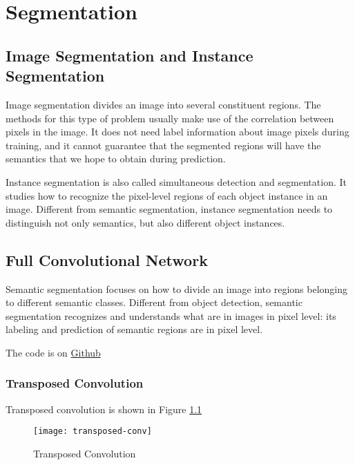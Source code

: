 
\chapter{Segmentation}

\section{Image Segmentation and Instance Segmentation}
\label{sec:image-segm-inst}

Image segmentation divides an image into several constituent regions.
The methods for this type of problem usually make use of the correlation between pixels in the image.
It does not need label information about image pixels during training, and it cannot guarantee that the segmented regions will have the semantics that we hope to obtain during prediction.

Instance segmentation is also called simultaneous detection and segmentation.
It studies how to recognize the pixel-level regions of each object instance in an image.
Different from semantic segmentation, instance segmentation needs to distinguish not only semantics, but also different object instances.


\section{Full Convolutional Network}
\label{sec:full-conv-netw}


Semantic segmentation focuses on how to divide an image into regions belonging to different semantic classes.
Different from object detection, semantic segmentation recognizes and understands what are in images in pixel level: its labeling and prediction of semantic regions are in pixel level.

The code is on \href{https://github.com/mingmingli916/segmentation}{Github}




\subsection{Transposed Convolution}
\label{sec:transp-conv}

Transposed convolution is shown in Figure \ref{fig:trans-conv}
\begin{figure}[!ht]
  \centering
  \texttt{[image: transposed-conv]}
  \caption{Transposed Convolution}
  \label{fig:trans-conv}
\end{figure}


